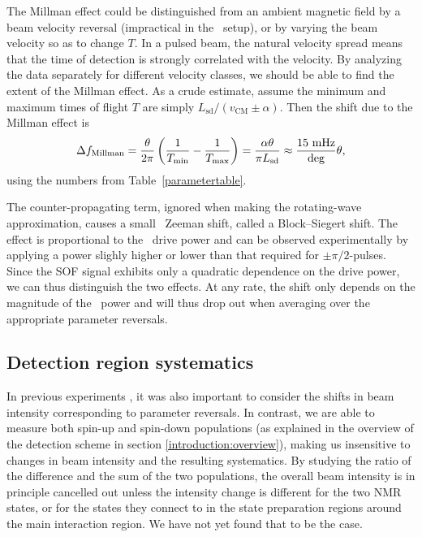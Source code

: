 The Millman effect could be distinguished from an ambient magnetic field by a
beam velocity reversal (impractical in the \CENTREX\ setup), or by varying the
beam velocity so as to change $T$. In a pulsed beam, the natural velocity spread
means that the time of detection is strongly correlated with the velocity. By
analyzing the data separately for different velocity classes, we should be able
to find the extent of the Millman effect. As a crude estimate, assume the
minimum and maximum times of flight $T$ are simply
$L_\text{sd}/(v_\text{CM}\pm\alpha)$. Then the shift due to the Millman
effect is
%
\[
    \Delta f_\text{Millman}
    =
    \frac{\theta}{2\pi}
    \left(
        \frac{1}{T_\text{min}} - \frac{1}{T_\text{max}}
    \right)
    =
    \frac{\alpha\theta}{\pi L_\text{sd}}
    \approx
    \frac{15~\mathrm{mHz}}{\text{deg}}\theta,
\]
%
using the numbers from Table~\ref{parametertable}.

The counter-propagating term, ignored when making the rotating-wave
approximation, causes a small \AC\ Zeeman shift, called a Block--Siegert shift.
The effect is proportional to the \RF\ drive power and can be observed
experimentally by applying a power slighly higher or lower than that required
for $\pm\pi/2$-pulses. Since the \gls{SOF} signal exhibits only a quadratic
dependence on the drive power, we can thus distinguish the two effects. At any
rate, the shift only depends on the magnitude of the \RF\ power and will thus
drop out when averaging over the appropriate parameter reversals.

\subsection{Detection region systematics}

In previous experiments \cite{cho1991search}, it was also important to consider
the shifts in beam intensity corresponding to parameter reversals. In contrast,
we are able to measure both spin-up and spin-down populations (as explained in
the overview of the detection scheme in section \ref{introduction:overview}),
making us insensitive to changes in beam intensity and the resulting
systematics. By studying the ratio of the difference and the sum of the two
populations, the overall beam intensity is in principle cancelled out unless the
intensity change is different for the two \gls{NMR} states, or for the states they
connect to in the state preparation regions around the main interaction region.
We have not yet found that to be the case.

